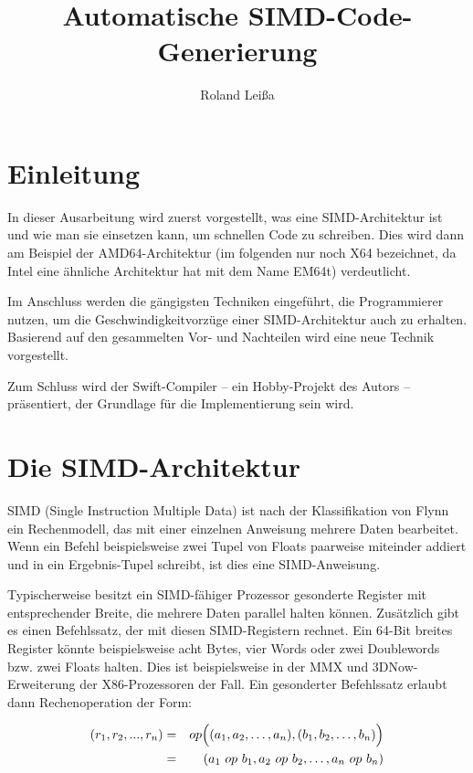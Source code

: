 \documentclass[a4paper,10pt]{article}
\title{Automatische SIMD-Code-Generierung}
\author{Roland Leißa}
\begin{document}
\maketitle
\newpage
\tableofcontents
\newpage

\section{Einleitung}

In dieser Ausarbeitung wird zuerst vorgestellt, was eine SIMD-Architektur ist und wie man sie
einsetzen kann, um schnellen Code zu schreiben. Dies wird dann am Beispiel der AMD64-Architektur (im
folgenden nur noch X64 bezeichnet, da Intel eine ähnliche Architektur hat mit dem Name EM64t)
verdeutlicht.

Im Anschluss werden die gängigsten Techniken eingeführt, die Programmierer nutzen, um die
Geschwindigkeitvorzüge einer SIMD-Architektur auch zu erhalten. Basierend auf den gesammelten
Vor- und Nachteilen wird eine neue Technik vorgestellt.

Zum Schluss wird der Swift-Compiler -- ein Hobby-Projekt des Autors -- präsentiert, der Grundlage
für die Implementierung sein wird.

\newpage

\section{Die SIMD-Architektur}

SIMD (Single Instruction Multiple Data) ist nach der Klassifikation von Flynn ein Rechenmodell, das
mit einer einzelnen Anweisung mehrere Daten bearbeitet. Wenn ein Befehl beispielsweise zwei Tupel
von Floats paarweise miteinder addiert und in ein Ergebnis-Tupel schreibt, ist dies eine
SIMD-Anweisung.

Typischerweise besitzt ein SIMD-fähiger Prozessor gesonderte Register mit entsprechender Breite, die
mehrere Daten parallel halten können. Zusätzlich gibt es einen Befehlssatz, der mit diesen
SIMD-Registern rechnet. Ein 64-Bit breites Register könnte beispielsweise acht Bytes, vier Words
oder zwei Doublewords bzw. zwei Floats halten. Dies ist beispielsweise in der MMX und
3DNow-Erweiterung der X86-Prozessoren der Fall. Ein gesonderter Befehlssatz erlaubt dann
Rechenoperation der Form:

\begin{eqnarray*}
    (r_1, r_2, ..., r_n)    & = & op\Bigl( (a_1, a_2, \dots, a_n), (b_1, b_2, \dots, b_n) \Bigr)\\ 
                            & = & (a_1 \ op \ b_1, a_2 \ op \ b_2, \dots, a_n \ op \ b_n)
\end{eqnarray*}
\end{document}
